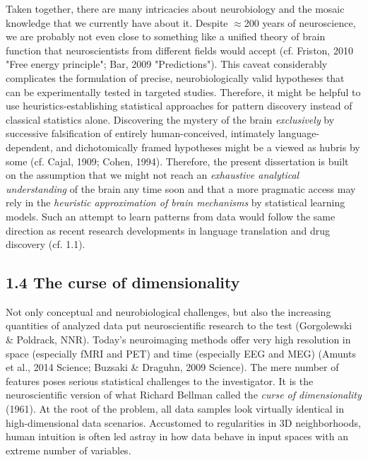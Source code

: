 \documentclass[authoryear,review,3p]{elsarticle}
\begin{document}
Taken together,
there are many intricacies about neurobiology and 
the mosaic knowledge that we currently have about it.
%
Despite $\approx$200 years of neuroscience,
we are probably not even close to something like a unified theory of
brain function
that neuroscientists from different fields would accept
(cf. Friston, 2010 "Free energy principle"; Bar, 2009 "Predictions").
This caveat considerably complicates
the formulation of precise, neurobiologically
valid hypotheses that can be experimentally tested in targeted studies.
%
Therefore, it might be helpful to use heuristics-establishing
statistical approaches for pattern discovery instead of
classical statistics alone.
%
Discovering the mystery of the brain \textit{exclusively} by
successive falsification of
entirely human-conceived,
intimately language-dependent,
and dichotomically framed hypotheses
might be a viewed as hubris by some
(cf. Cajal, 1909; Cohen, 1994).
%
Therefore,
the present dissertation is built on the assumption that
we might not reach an \textit{exhaustive analytical understanding}
of the brain any time soon
and that a more pragmatic access
may rely in the \textit{heuristic
approximation of brain mechanisms} by statistical learning models.
%
Such an attempt to learn patterns from data
would follow the same
direction as recent research developments in
language translation and drug discovery (cf. 1.1).



\subsection*{1.4 The curse of dimensionality}

Not only conceptual and neurobiological challenges,
but also the increasing quantities of analyzed data
put neuroscientific research to the test
(Gorgolewski \& Poldrack, NNR).
%
Today's neuroimaging methods offer very high resolution in
space (especially fMRI and PET)
and
time (especially EEG and MEG)
(Amunts et al., 2014 Science; Buzsaki \& Draguhn, 2009 Science).
%
The mere number of features poses serious
statistical challenges to the investigator.
It is the neuroscientific version of what Richard Bellman
called the \textit{curse of dimensionality} (1961).
%
At the root of the problem,
all data samples look virtually identical
in high-dimensional data scenarios.
%
Accustomed to regularities in 3D neighborhoods,
human intuition is often led astray in
how data behave in
input spaces with an extreme number of variables.
\end{document}
